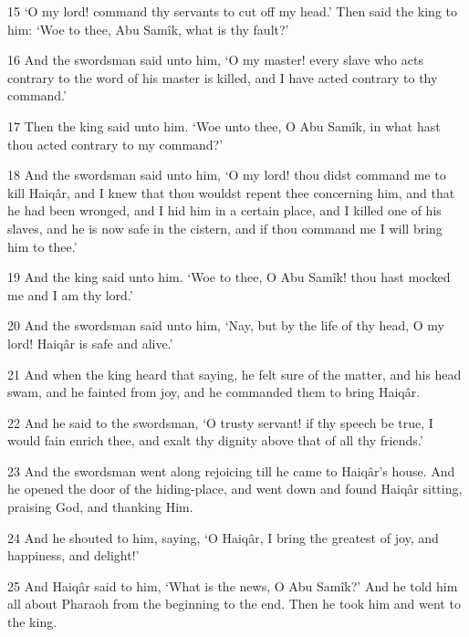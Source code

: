 \par 15 ‘O my lord! command thy servants to cut off my head.’ Then said the king to him: ‘Woe to thee, Abu Samîk, what is thy fault?’

\par 16 And the swordsman said unto him, ‘O my master! every slave who acts contrary to the word of his master is killed, and I have acted contrary to thy command.’

\par 17 Then the king said unto him. ‘Woe unto thee, O Abu Samîk, in what hast thou acted contrary to my command?’

\par 18 And the swordsman said unto him, ‘O my lord! thou didst command me to kill Haiqâr, and I knew that thou wouldst repent thee concerning him, and that he had been wronged, and I hid him in a certain place, and I killed one of his slaves, and he is now safe in the cistern, and if thou command me I will bring him to thee.’

\par 19 And the king said unto him. ‘Woe to thee, O Abu Samîk! thou hast mocked me and I am thy lord.’

\par 20 And the swordsman said unto him, ‘Nay, but by the life of thy head, O my lord! Haiqâr is safe and alive.’

\par 21 And when the king heard that saying, he felt sure of the matter, and his head swam, and he fainted from joy, and he commanded them to bring Haiqâr.

\par 22 And he said to the swordsman, ‘O trusty servant! if thy speech be true, I would fain enrich thee, and exalt thy dignity above that of all thy friends.’

\par 23 And the swordsman went along rejoicing till he came to Haiqâr's house. And he opened the door of the hiding-place, and went down and found Haiqâr sitting, praising God, and thanking Him.

\par 24 And he shouted to him, saying, ‘O Haiqâr, I bring the greatest of joy, and happiness, and delight!’

\par 25 And Haiqâr said to him, ‘What is the news, O Abu Samîk?’ And he told him all about Pharaoh from the beginning to the end. Then he took him and went to the king.

